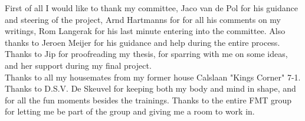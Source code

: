 First of all I would like to thank my committee, Jaco van de Pol for his guidance and steering of the project, Arnd Hartmanns for for all his comments on my writings, Rom Langerak for his last minute entering into the committee. Also thanks to Jeroen Meijer for his guidance and help during the entire process. \\


Thanks to Jip for proofreading my thesis, for sparring with me on some ideas, and her support during my final project.\\


Thanks to all my housemates from my former house Calslaan "Kings Corner" 7-1. Thanks to D.S.V. De Skeuvel for keeping both my body and mind in shape, and for all the fun moments besides the trainings. Thanks to the entire FMT group for letting me be part of the group and giving me a room to work in.